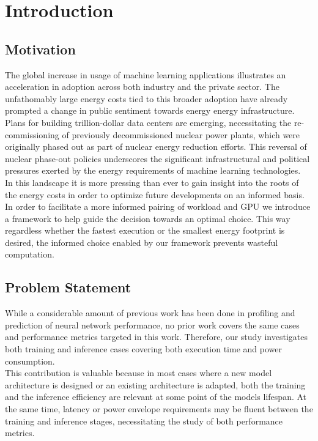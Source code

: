 \chapter{Introduction}\label{chap:introduction}

\section{Motivation}

The global increase in usage of machine learning applications
 illustrates an acceleration in adoption across
both industry and the private sector. The unfathomably
large energy costs tied to this broader adoption have
already prompted a change in public sentiment towards
 energy energy infrastructure. Plans for building
trillion-dollar data centers are emerging, necessitating
the re-commissioning of previously decommissioned
nuclear power plants, which were originally phased
out as part of nuclear energy reduction efforts. This
reversal of nuclear phase-out policies underscores the
significant infrastructural and political pressures
exerted by the energy requirements of machine learning
technologies. \\
In this landscape it is more pressing than ever to gain
insight into the roots of the energy costs in order to
optimize future developments on an informed basis. \\
In order to facilitate a more informed pairing of workload 
and GPU we introduce a framework to help guide the decision 
towards an optimal choice. This way regardless whether 
the fastest execution or the smallest energy footprint is 
desired, the informed choice enabled by our framework
prevents wasteful computation.

\section{Problem Statement}
While a considerable amount of previous work has been done in
profiling and prediction of neural network performance, no prior
work covers the same cases and performance metrics targeted in this work.
Therefore, our study investigates both training and inference cases 
covering both execution time and power consumption. \\
This contribution is valuable because in most cases where a new model
architecture is designed or an existing architecture is adapted, 
both the training and the inference efficiency are relevant at some
point of the models lifespan. At the same time, latency or power 
envelope requirements may be fluent between the training and
inference stages, necessitating the study of both performance metrics.


